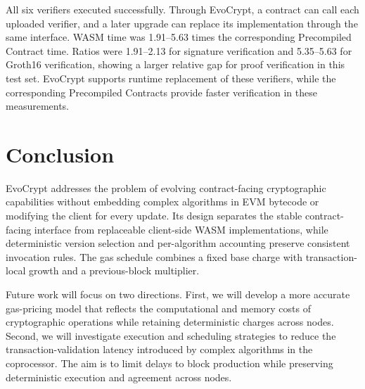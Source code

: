 \documentclass[runningheads]{llncs}
\begin{document}
All six verifiers executed successfully. Through EvoCrypt, a contract can call each uploaded verifier, and a later upgrade can replace its implementation through the same interface. WASM time was 1.91--5.63 times the corresponding Precompiled Contract time. Ratios were 1.91--2.13 for signature verification and 5.35--5.63 for Groth16 verification, showing a larger relative gap for proof verification in this test set. EvoCrypt supports runtime replacement of these verifiers, while the corresponding Precompiled Contracts provide faster verification in these measurements.

\section{Conclusion}\label{sec6}

EvoCrypt addresses the problem of evolving contract-facing cryptographic capabilities without embedding complex algorithms in EVM bytecode or modifying the client for every update. Its design separates the stable contract-facing interface from replaceable client-side WASM implementations, while deterministic version selection and per-algorithm accounting preserve consistent invocation rules. The gas schedule combines a fixed base charge with transaction-local growth and a previous-block multiplier.

Future work will focus on two directions. First, we will develop a more accurate gas-pricing model that reflects the computational and memory costs of cryptographic operations while retaining deterministic charges across nodes. Second, we will investigate execution and scheduling strategies to reduce the transaction-validation latency introduced by complex algorithms in the coprocessor. The aim is to limit delays to block production while preserving deterministic execution and agreement across nodes.




\end{document}
